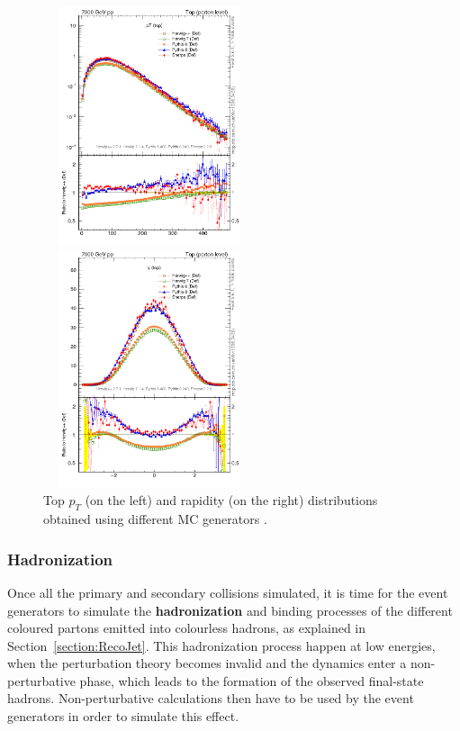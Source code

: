 \documentclass[a4paper, 10pt, openright]{report}
\begin{document}
\begin{figure}[htbp]
\centering
\begin{minipage}[b]{.47\textwidth}
\includegraphics[width=6.2cm, height=7cm]{figs/TopPt.png}
\end{minipage}\hfill
\begin{minipage}[b]{.47\textwidth}
\includegraphics[width=6.2cm, height=7cm]{figs/TopRapidity.png}
\end{minipage} \hfill
\caption{Top $p_T$ (on the left) and rapidity (on the right) distributions obtained using different \ac{MC} generators \cite{ComparisonGenerators}.}
\label{fig:ComparisonGen}
\end{figure}

\subsubsection*{Hadronization}

Once all the primary and secondary collisions simulated, it is time for the event generators to simulate the \textbf{hadronization} and binding processes of the different coloured partons emitted into colourless hadrons, as explained in Section~\ref{section:RecoJet}. This hadronization process happen at low energies, when the perturbation theory becomes invalid and the dynamics enter a non-perturbative phase, which leads to the formation of the observed final-state hadrons. Non-perturbative calculations then have to be used by the event generators in order to simulate this effect.
\end{document}
